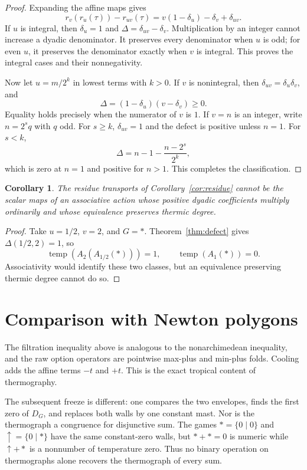 \documentclass[11pt]{article}
\newtheorem{corollary}[theorem]{Corollary}
\theoremstyle{definition}
\theoremstyle{remark}
\newcommand{\temp}{\operatorname{temp}}
\begin{document}
\begin{proof}
Expanding the affine maps gives
\[
 r_v(r_u(\tau))-r_{uv}(\tau)
 =v(1-\delta_u)-\delta_v+\delta_{uv}.
\]
If $u$ is integral, then $\delta_u=1$ and
$\Delta=\delta_{uv}-\delta_v$.  Multiplication by an integer cannot increase
a dyadic denominator.  It preserves every denominator when $u$ is odd; for
even $u$, it preserves the denominator exactly when $v$ is integral.  This
proves the integral cases and their nonnegativity.

Now let $u=m/2^k$ in lowest terms with $k>0$.  If $v$ is nonintegral, then
$\delta_{uv}=\delta_u\delta_v$, and
\[
  \Delta=(1-\delta_u)(v-\delta_v)\ge0.
\]
Equality holds precisely when the numerator of $v$ is $1$.  If $v=n$ is an
integer, write $n=2^sq$ with $q$ odd.  For $s\ge k$,
$\delta_{uv}=1$ and the defect is positive unless $n=1$.  For $s<k$,
\[
  \Delta=n-1-\frac{n-2^s}{2^k},
\]
which is zero at $n=1$ and positive for $n>1$.  This completes the
classification.
\end{proof}

\begin{corollary}\label{cor:no-action}
The residue transports of Corollary~\ref{cor:residue} cannot be the scalar
maps of an associative action whose positive dyadic coefficients multiply
ordinarily and whose equivalence preserves thermic degree.
\end{corollary}

\begin{proof}
Take $u=1/2$, $v=2$, and $G=*$.  Theorem~\ref{thm:defect} gives
$\Delta(1/2,2)=1$, so
\[
 \temp(A_2(A_{1/2}(*)))=1,
 \qquad
 \temp(A_1(*))=0.
\]
Associativity would identify these two classes, but an equivalence preserving
thermic degree cannot do so.
\end{proof}

\section{Comparison with Newton polygons}

The filtration inequality above is analogous to the nonarchimedean
inequality, and the raw option operators are
pointwise max-plus and min-plus folds.  Cooling adds the affine terms
$-t$ and $+t$.  This is the exact tropical content of thermography.

The subsequent freeze is different: one compares the two envelopes, finds
the first zero of $D_G$, and replaces both walls by one constant mast.  Nor is
the thermograph a congruence for disjunctive sum.  The games
$*=\{0\mid0\}$ and $\uparrow=\{0\mid *\}$ have the same constant-zero walls,
but $*+*=0$ is numeric while $\uparrow+*$ is a nonnumber of temperature zero.
Thus no binary operation on thermographs alone recovers the thermograph of
every sum.
\end{document}
